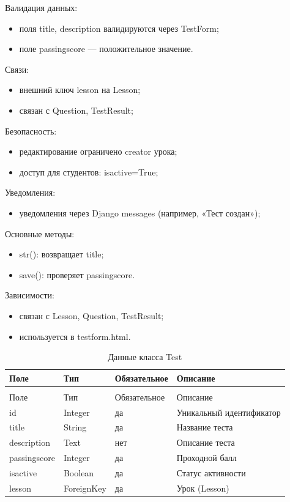 Валидация данных:
	\begin{itemize}
		\item поля title, description валидируются через TestForm;
		\item поле passingscore — положительное значение.
	\end{itemize}
	
Связи:
	\begin{itemize}
		\item внешний ключ lesson на Lesson;
		\item связан с Question, TestResult;
	\end{itemize}
	
Безопасность:
	\begin{itemize}
		\item редактирование ограничено creator урока;
		\item доступ для студентов: isactive=True;
	\end{itemize}
	
Уведомления:
	\begin{itemize}
		\item уведомления через Django messages (например, «Тест создан»);
	\end{itemize}
	
Основные методы:
	\begin{itemize}
		\item str(): возвращает title;
		\item save(): проверяет passingscore.
	\end{itemize}
	
Зависимости:
	\begin{itemize}
		\item связан с Lesson, Question, TestResult;
		\item используется в testform.html.
	\end{itemize}


\begin{xltabular}{\textwidth}{|l|l|l|X|}
	\caption{Данные класса Test\label{tab:test_attributes}}\\
	\hline
	Поле & Тип & Обязательное & Описание \\ \hline
	\endfirsthead
	\\
	\hline
	Поле & Тип & Обязательное & Описание \\ \hline
	\endhead
	id & Integer & да & Уникальный идентификатор \\ \hline
	title & String & да & Название теста \\ \hline
	description & Text & нет & Описание теста \\ \hline
	passingscore & Integer & да & Проходной балл \\ \hline
	isactive & Boolean & да & Статус активности \\ \hline
	lesson & ForeignKey & да & Урок (Lesson) \\ \hline
\end{xltabular}

